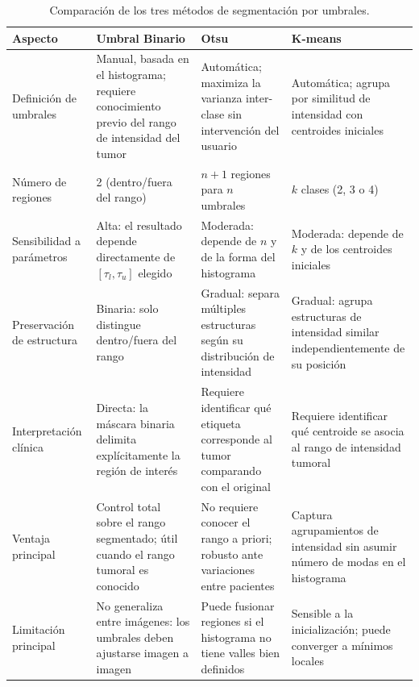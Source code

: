 \documentclass[12pt, a4paper]{article}
\begin{document}
\begin{table}[H]
\centering
\renewcommand{\arraystretch}{1.5}
\begin{tabularx}{\textwidth}{lXXX}
\toprule
\textbf{Aspecto} &
\textbf{Umbral Binario} &
\textbf{Otsu} &
\textbf{K-means} \\
\midrule
Definición de umbrales &
Manual, basada en el histograma; requiere conocimiento previo del rango de intensidad del tumor &
Automática; maximiza la varianza inter-clase sin intervención del usuario &
Automática; agrupa por similitud de intensidad con centroides iniciales \\

Número de regiones &
2 (dentro/fuera del rango) &
$n+1$ regiones para $n$ umbrales &
$k$ clases (2, 3 o 4) \\

Sensibilidad a parámetros &
Alta: el resultado depende directamente de $[\tau_l, \tau_u]$ elegido &
Moderada: depende de $n$ y de la forma del histograma &
Moderada: depende de $k$ y de los centroides iniciales \\

Preservación de estructura &
Binaria: solo distingue dentro/fuera del rango &
Gradual: separa múltiples estructuras según su distribución de intensidad &
Gradual: agrupa estructuras de intensidad similar independientemente de su posición \\

Interpretación clínica &
Directa: la máscara binaria delimita explícitamente la región de interés &
Requiere identificar qué etiqueta corresponde al tumor comparando con el original &
Requiere identificar qué centroide se asocia al rango de intensidad tumoral \\

Ventaja principal &
Control total sobre el rango segmentado; útil cuando el rango tumoral es conocido &
No requiere conocer el rango a priori; robusto ante variaciones entre pacientes &
Captura agrupamientos de intensidad sin asumir número de modas en el histograma \\

Limitación principal &
No generaliza entre imágenes: los umbrales deben ajustarse imagen a imagen &
Puede fusionar regiones si el histograma no tiene valles bien definidos &
Sensible a la inicialización; puede converger a mínimos locales \\
\bottomrule
\end{tabularx}
\caption{Comparación de los tres métodos de segmentación por umbrales.}
\label{tab:comparacion}
\end{table}
\end{document}
